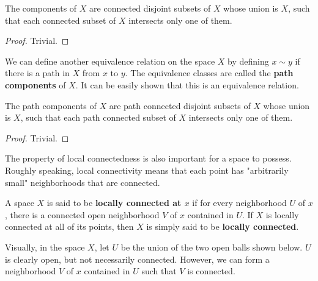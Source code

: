 \documentclass{article}
\begin{document}
    \begin{theorem}
    The components of $X$ are connected disjoint subsets of $X$ whose union is $X$, such that each connected subset of $X$ intersects only one of them. 
    \end{theorem}
    \begin{proof}
    Trivial. 
    \end{proof}

    \begin{definition}
    We can define another equivalence relation on the space $X$ by defining $x \sim y$ if there is a path in $X$ from $x$ to $y$. The equivalence classes are called the \textbf{path components} of $X$. It can be easily shown that this is an equivalence relation. 
    \end{definition}

    \begin{theorem}
    The path components of $X$ are path connected disjoint subsets of $X$ whose union is $X$, such that each path connected subset of $X$ intersects only one of them. 
    \end{theorem}
    \begin{proof}
    Trivial.
    \end{proof}

    The property of local connectedness is also important for a space to possess. Roughly speaking, local connectivity means that each point has "arbitrarily small" neighborhoods that are connected. 

    \begin{definition}
    A space $X$ is said to be \textbf{locally connected at $x$} if for every neighborhood $U$ of $x$, there is a connected open neighborhood $V$ of $x$ contained in $U$. If $X$ is locally connected at all of its points, then $X$ is simply said to be \textbf{locally connected}. 
    \end{definition}
    Visually, in the space $X$, let $U$ be the union of the two open balls shown below. $U$ is clearly open, but not necessarily connected. However, we can form a  neighborhood $V$ of $x$ contained in $U$ such that $V$ is connected. 
    \begin{center}
    \end{center}
\end{document}
